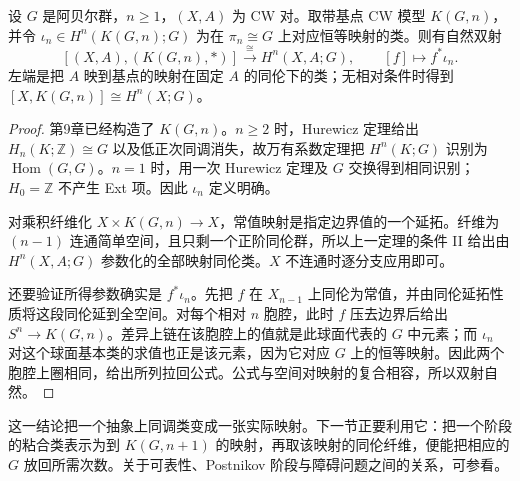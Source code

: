 \begin{theorem}[上同调的可表性]\label{g2:thm:em-representability}
	设 \(G\) 是阿贝尔群，\(n\ge1\)，\((X,A)\) 为 CW 对。取带基点 CW 模型 \(K(G,n)\)，并令 \(\iota_n\in H^n(K(G,n);G)\) 为在 \(\pi_n\cong G\) 上对应恒等映射的类。则有自然双射
	\[
		[(X,A),(K(G,n),*)]\xrightarrow{\cong}H^n(X,A;G),\qquad [f]\longmapsto f^*\iota_n.
	\]
	左端是把 \(A\) 映到基点的映射在固定 \(A\) 的同伦下的类；无相对条件时得到 \([X,K(G,n)]\cong H^n(X;G)\)。
\end{theorem}
\begin{proof}
	第9章已经构造了 \(K(G,n)\)。\(n\ge2\) 时，Hurewicz 定理给出 \(H_n(K;\mathbb Z)\cong G\) 以及低正次同调消失，故万有系数定理把 \(H^n(K;G)\) 识别为 \(\operatorname{Hom}(G,G)\)。\(n=1\) 时，用一次 Hurewicz 定理及 \(G\) 交换得到相同识别；\(H_0=\mathbb Z\) 不产生 Ext 项。因此 \(\iota_n\) 定义明确。

	对乘积纤维化 \(X\times K(G,n)\to X\)，常值映射是指定边界值的一个延拓。纤维为 \((n-1)\) 连通简单空间，且只剩一个正阶同伦群，所以上一定理的条件 II 给出由 \(H^n(X,A;G)\) 参数化的全部映射同伦类。\(X\) 不连通时逐分支应用即可。

	还要验证所得参数确实是 \(f^*\iota_n\)。先把 \(f\) 在 \(X_{n-1}\) 上同伦为常值，并由同伦延拓性质将这段同伦延到全空间。对每个相对 \(n\) 胞腔，此时 \(f\) 压去边界后给出 \(S^n\to K(G,n)\)。差异上链在该胞腔上的值就是此球面代表的 \(G\) 中元素；而 \(\iota_n\) 对这个球面基本类的求值也正是该元素，因为它对应 \(G\) 上的恒等映射。因此两个胞腔上圈相同，给出所列拉回公式。公式与空间对映射的复合相容，所以双射自然。
\end{proof}

这一结论把一个抽象上同调类变成一张实际映射。下一节正要利用它：把一个阶段的粘合类表示为到 \(K(G,n+1)\) 的映射，再取该映射的同伦纤维，便能把相应的 \(G\) 放回所需次数。关于可表性、Postnikov 阶段与障碍问题之间的关系，可参看\cite[第4.3节，Connections with Cohomology]{Hatcher2002}。
